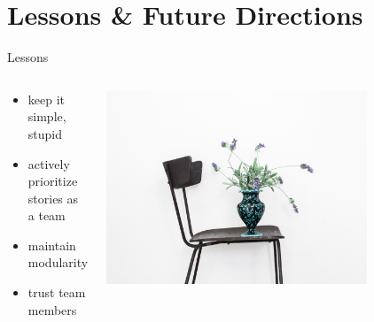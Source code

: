 \section{Lessons \& Future Directions}

\begin{frame}{Lessons}
\begin{columns}
\begin{column}{0.5\textwidth}
\begin{itemize}
  \item keep it simple, stupid
  \item actively prioritize stories as a team
  \item maintain modularity
  \item trust team members
\end{itemize}
\end{column}
\begin{column}{0.5\textwidth}  %
    \begin{center}
     \includegraphics[width=0.75\textwidth]{img/DeathtoStock_Clementine3}
     \end{center}
\end{column}
\end{columns}
\end{frame}

